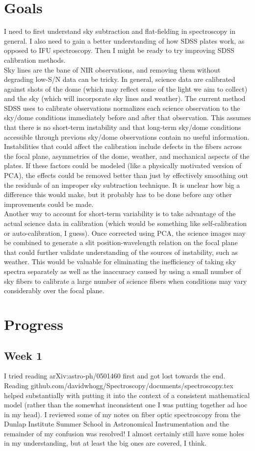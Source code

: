 \documentclass[12pt]{article}
\begin{document}
\section*{Goals}
I need to first understand sky subtraction and flat-fielding in spectroscopy in general.  I also need to gain a better understanding of how SDSS plates work, as opposed to IFU spectroscopy.  Then I might be ready to try improving SDSS calibration methods.\\
\indent Sky lines are the bane of NIR observations, and removing them without degrading low-S/N data can be tricky.  In general, science data are calibrated against shots of the dome (which may reflect some of the light we aim to collect) and the sky (which will incorporate sky lines and weather).  The current method SDSS uses to calibrate observations normalizes each science observation to the sky/dome conditions immediately before and after that observation.  This assumes that there is no short-term instability and that long-term sky/dome conditions accessible through previous sky/dome observations contain no useful information.\\
\indent Instabilities that could affect the calibration include defects in the fibers across the focal plane, asymmetries of the dome, weather, and mechanical aspects of the plates.  If these factors could be modeled (like a physically motivated version of PCA), the effects could be removed better than just by effectively smoothing out the residuals of an improper sky subtraction technique.  It is unclear how big a difference this would make, but it probably has to be done before any other improvements could be made.\\
\indent Another way to account for short-term variability is to take advantage of the actual science data in calibration (which would be something like self-calibration or auto-calibration, I guess).  Once corrected using PCA, the science images may be combined to generate a slit position-wavelength relation on the focal plane that could further validate understanding of the sources of instability, such as weather.  This would be valuable for eliminating the inefficiency of taking sky spectra separately as well as the inaccuracy caused by using a small number of sky fibers to calibrate a large number of science fibers when conditions may vary considerably over the focal plane.
\section*{Progress}
\subsection*{Week 1}
I tried reading arXiv:astro-ph/0501460 first and got lost towards the end.  Reading github.com/davidwhogg/Spectroscopy/documents/spectroscopy.tex helped substantially with putting it into the context of a consistent mathematical model (rather than the somewhat inconsistent one I was putting together ad hoc in my head).  I reviewed some of my notes on fiber optic spectroscopy from the Dunlap Institute Summer School in Astronomical Instrumentation and the remainder of my confusion was resolved!  I almost certainly still have some holes in my understanding, but at least the big ones are covered, I think.
\end{document}
